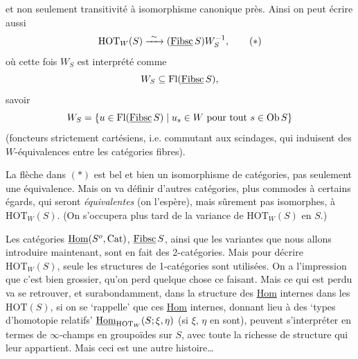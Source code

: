 et non seulement transitivité à isomorphisme canonique près. Ainsi on peut écrire aussi
\[
\mathrm{HOT}_W(S) \xrightarrow{\ \sim\ } (\ul{Fibsc}\,S)W_S^{-1}, \tag*{$(*)$}
\]
où cette fois $W_S$ est interprété comme
\[
W_S \subseteq \mathrm{Fl}(\underline{\mathrm{Fibsc}}\,S),
\]
savoir
\[
W_S = \{u \in \mathrm{Fl}(\underline{\mathrm{Fibsc}}\,S) \mid u_s \in W \text{ pour tout } s \in \mathrm{Ob}\,S\}
\]
(foncteurs strictement cartésiens, i.e. commutant aux scindages, qui induisent des $W$-équivalences entre les catégories fibres).

La flèche dans $(*)$ est bel et bien un isomorphisme de catégories, pas seulement une équivalence. Mais on va définir d'autres catégories, plus commodes à certains égards, qui seront \textit{équivalentes} (on l'espère), mais sûrement pas isomorphes, à $\mathrm{HOT}_W(S)$. (On s'occupera plus tard de la variance de $\mathrm{HOT}_W(S)$ en $S$.)

Les catégories $\underline{\mathrm{Hom}}(S^o,\mathrm{Cat})$, $\underline{\mathrm{Fibsc}}\,S$, ainsi que les variantes que nous allons introduire maintenant, sont en fait des 2-catégories. Mais pour décrire $\mathrm{HOT}_W(S)$, seule les structures de 1-catégories sont utilisées. On a l'impression que c'est bien %
grossier, qu'on perd quelque chose ce faisant. Mais ce qui est perdu va se retrouver, et surabondamment, dans la structure des \underline{Hom} internes dans les $\mathrm{HOT}(S)$, si on se `rappelle' que ces \underline{Hom} internes, donnant lieu à des `types d'homotopie relatifs' $\underline{\mathrm{Hom}}_{\mathrm{HOT}_W}(S;\xi,\eta)$ (si $\xi$, $\eta$ en sont), peuvent s'interpréter en termes de $\infty$-champs en groupoïdes sur $S$, avec toute la richesse de structure qui leur appartient. Mais ceci est une autre histoire\dots

